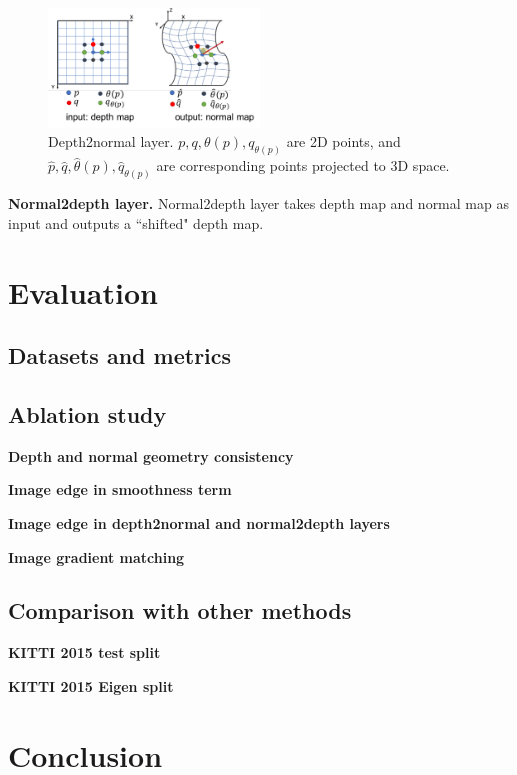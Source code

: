 \documentclass[letterpaper]{article} %
\begin{document}
\begin{figure}
\centering
\includegraphics[width=0.5\textwidth]{figures/d2n.pdf}
\caption{Depth2normal layer. $p, q, \theta(p), q_{\theta(p)}$ are 2D points, and $\hat{p}, \hat{q}, \hat{\theta}(p), \hat{q}_{\theta(p)}$ are corresponding points projected to 3D space.}
\label{fig:d2n}
\end{figure}

\textbf{Normal2depth layer.} Normal2depth layer takes depth map and normal map as input and outputs a ``shifted" depth map. 

\section{Evaluation}

\subsection{Datasets and metrics}

\subsection{Ablation study}

\textbf{Depth and normal geometry consistency}

\textbf{Image edge in smoothness term}

\textbf{Image edge in depth2normal and normal2depth layers}

\textbf{Image gradient matching}

\subsection{Comparison with other methods}

\textbf{KITTI 2015 test split}

\textbf{KITTI 2015 Eigen split}

\section{Conclusion}
\end{document}
